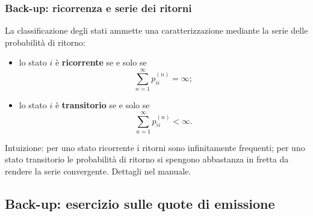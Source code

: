 \documentclass[handout]{beamer}%
\newenvironment{stepitemize}{\begin{itemize}[<+->]}{\end{itemize} }
\providecommand{\QTR}[2]{\csname #1\endcsname{#2}}
\begin{document}
\begin{frame}%
%

\frametitle{Back-up: ricorrenza e serie dei ritorni}%
%

%


La classificazione degli stati ammette una caratterizzazione mediante la serie
delle probabilit\`{a} di ritorno:

\begin{stepitemize}
\item lo stato $i$ \`{e} \textbf{ricorrente} se e solo se
\[
\sum_{n=1}^{\infty}p_{ii}^{(n)}=\infty;
\]


\item lo stato $i$ \`{e} \textbf{transitorio} se e solo se
\[
\sum_{n=1}^{\infty}p_{ii}^{(n)}<\infty.
\]

\end{stepitemize}

\medskip

\begin{center}
{\small Intuizione: per uno stato ricorrente i ritorni sono infinitamente
frequenti; per uno stato transitorio le probabilit\`{a} di ritorno si spengono
abbastanza in fretta da rendere la serie convergente. Dettagli nel manuale.}
\end{center}%

\transboxout
\end{frame}%




\subsection{Back-up: esercizio sulle quote di emissione}%
\end{document}
